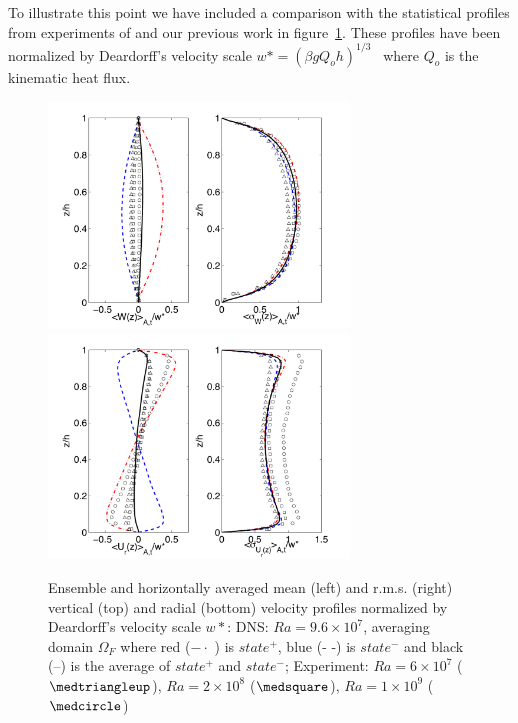 \documentclass[twocolumn,10pt]{tsfp}
\begin{document}
To illustrate this point we have included a comparison with the statistical profiles from experiments of \cite{fernandes2001spatial} and our previous work \citep{sakievich2016large} in figure~\ref{fig:profs}. These profiles have been normalized by Deardorff's velocity scale $w*=(\beta g Q_o h)^{1/3}$~\citep{deardorff1970convective} where $Q_o$ is the kinematic heat flux.
\begin{figure}
\centering
\includegraphics[height=6cm]{PRL_Fig1}
\includegraphics[height=6cm]{PRL_Fig2}
\caption{Ensemble and horizontally averaged mean (left) and r.m.s. (right) vertical (top) and radial (bottom) velocity profiles normalized by Deardorff's velocity scale $w*$: DNS: $Ra=9.6\times10^7$, averaging domain $\Omega_F$ where red ($- \cdot$ ) is $state^+$, blue (- -) is $state^-$ and black (--) is the average of $state^+$ and $state^-$; Experiment: $Ra=6\times10^7$ ($\medtriangleup$), $Ra=2\times10^8$ ($\medsquare$),  $Ra=1\times10^9$ ($\medcircle$)}
\label{fig:profs}
\end{figure}
\end{document}
